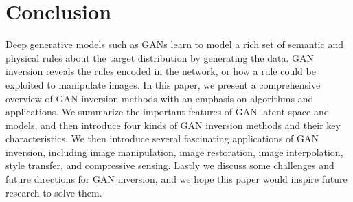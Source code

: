 \section{Conclusion}
\label{sec:conclusion}
Deep generative models such as GANs learn to model a rich set of semantic and physical rules about the target distribution by generating the data. 
GAN inversion reveals the rules encoded in the network, or how a rule could be exploited to manipulate images. 
In this paper, we present a comprehensive overview of GAN inversion methods with an emphasis on algorithms and applications. 
We summarize the important features of GAN latent space and models, and then introduce four kinds of GAN inversion methods and their key characteristics. 
We then introduce several fascinating applications of GAN inversion, including image manipulation, image restoration, image interpolation, style transfer, and compressive sensing.
Lastly we discuss some challenges and future directions for GAN inversion, and we hope this paper would inspire future research to solve them.